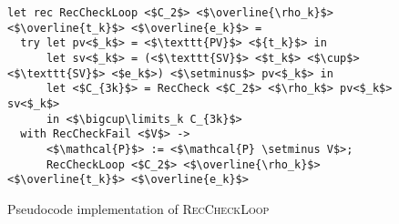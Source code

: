 \begin{figure}
\centering

\begin{verbatim}
let rec RecCheckLoop <$C_2$> <$\overline{\rho_k}$> <$\overline{t_k}$> <$\overline{e_k}$> =
  try let pv<$_k$> = <$\texttt{PV}$> <${t_k}$> in
      let sv<$_k$> = (<$\texttt{SV}$> <$t_k$> <$\cup$> <$\texttt{SV}$> <$e_k$>) <$\setminus$> pv<$_k$> in
      let <$C_{3k}$> = RecCheck <$C_2$> <$\rho_k$> pv<$_k$> sv<$_k$>
      in <$\bigcup\limits_k C_{3k}$>
  with RecCheckFail <$V$> ->
      <$\mathcal{P}$> := <$\mathcal{P} \setminus V$>;
      RecCheckLoop <$C_2$> <$\overline{\rho_k}$> <$\overline{t_k}$> <$\overline{e_k}$>
\end{verbatim}

\caption{Pseudocode implementation of \textsc{RecCheckLoop}}
\label{fig:helpers}
\end{figure}